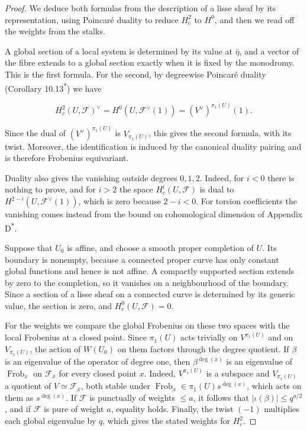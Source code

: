 \documentclass[11pt]{article}
\newcommand{\bpout}[1]{#1\textsuperscript{\hyperlink{bp-outside}{\ensuremath{\ast}}}}
\begin{document}
\begin{proof}[{Proof}]\label{bp105}%
We deduce both formulas from the description of a lisse sheaf by its representation, using Poincaré duality to reduce \(H^2_c\) to \(H^0\), and then we read off the weights from the stalks.

A global section of a local system is determined by its value at \(\bar\eta\), and a vector of the fibre extends to a global section exactly when it is fixed by the monodromy. This is the first formula.  For the second, by degreewise Poincaré duality (Corollary \bpout{10.13}) we have

\[
H_c^2(U,\mathcal F)^\vee
=H^0(U,\mathcal F^\vee(1))=(V^\vee)^{\pi_1(U)}(1).
\]

Since the dual of \((V^\vee)^{\pi_1(U)}\) is \(V_{\pi_1(U)}\), this gives the second formula, with its twist. Moreover, the identification is induced by the canonical duality pairing and is therefore Frobenius equivariant.

Duality also gives the vanishing outside degrees \(0,1,2\). Indeed, for \(i<0\) there is nothing to prove, and for \(i>2\) the space \(H_c^i(U,\mathcal F)\) is dual to \(H^{2-i}(U,\mathcal F^\vee(1))\), which is zero because \(2-i<0\). For torsion coefficients the vanishing comes instead from the bound on cohomological dimension of Appendix \bpout{D}.

Suppose that \(U_0\) is affine, and choose a smooth proper completion of \(U\). Its boundary is nonempty, because a connected proper curve has only constant global functions and hence is not affine. A compactly supported section extends by zero to the completion, so it vanishes on a neighbourhood of the boundary. Since a section of a lisse sheaf on a connected curve is determined by its generic value, the section is zero, and \(H_c^0(U,\mathcal F)=0\).

For the weights we compare the global Frobenius on these two spaces with the local Frobenius at a closed point. Since \(\pi_1(U)\) acts trivially on \(V^{\pi_1(U)}\) and on \(V_{\pi_1(U)}\), the action of \(W(U_0)\) on them factors through the degree quotient.  If \(\beta\) is an eigenvalue of the operator of degree one, then \(\beta^{\deg(x)}\) is an eigenvalue of \(\operatorname{Frob}_x\) on \(\mathcal F_{\bar x}\) for every closed point \(x\). Indeed, \(V^{\pi_1(U)}\) is a subspace and \(V_{\pi_1(U)}\) a quotient of \(V\simeq\mathcal F_{\bar x}\), both stable under \(\operatorname{Frob}_x\in\pi_1(U)s^{\deg(x)}\), which acts on them as \(s^{\deg(x)}\).  If \(\mathcal F\) is punctually of weights \(\le a\), it follows that \(|\iota(\beta)|\le q^{a/2}\), and if \(\mathcal F\) is pure of weight \(a\), equality holds. Finally, the twist \((-1)\) multiplies each global eigenvalue by \(q\), which gives the stated weights for \(H_c^2\).
\end{proof}
\end{document}
